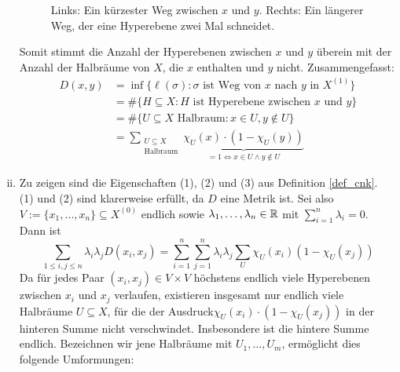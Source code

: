 \begin{beweis}
\begin{enumerate}[(i)]
\begin{figure}[h]
			\caption{Links: Ein kürzester Weg zwischen $x$ und $y$. Rechts: Ein längerer Weg, der eine Hyperebene zwei Mal schneidet.}
		\end{figure}
		
		Somit stimmt die Anzahl der Hyperebenen zwischen $x$ und $y$ überein mit der Anzahl der Halbräume von $X$, die $x$ enthalten und $y$ nicht. Zusammengefasst:
		\begin{equation}
		\begin{aligned}
		D(x,y) &= \inf \{ \ell(\sigma) : \sigma \text{ ist Weg von } x \text{ nach } y \text{ in } X^{(1)}\} \\
		&= \#\{H \subseteq X : H \text{ ist Hyperebene zwischen } x \text{ und } y\} \\
		&= \#\{U \subseteq X \text{ Halbraum} : x \in U, y \notin U \} \\
		&= \sum_{\substack{U \subseteq X \\ \text{Halbraum}}} \underbrace{\chi_U(x) \cdot (1- \chi_U(y))}_{= 1 \Leftrightarrow x \in U \wedge y \notin U}
		\end{aligned}
		\end{equation}
		\item Zu zeigen sind die Eigenschaften (1), (2) und (3) aus Definition \ref{def_cnk}. \\
		(1) und (2) sind klarerweise erfüllt, da $D$ eine Metrik ist. Sei also $V:= \{x_1, \dots, x_n\} \subseteq X^{(0)}$ endlich sowie $\lambda_1, \dots, \lambda_n \in \mathbb{R}$ mit $\sum_{i=1}^{n} \lambda_i = 0$. Dann ist
		\[ \sum\limits_{1 \leq i,j \leq n} \lambda_i \lambda_j D(x_i,x_j) = \sum\limits_{i=1}^{n} \sum\limits_{j=1}^{n} \lambda_i \lambda_j \sum\limits_{U} \chi_U (x_i) (1-\chi_U (x_j))\]
		\newpage
		Da für jedes Paar $(x_i,x_j) \in V \times V$ höchstens endlich viele Hyperebenen zwischen $x_i$ und $x_j$ verlaufen, existieren insgesamt nur endlich viele Halbräume $U \subseteq X$, für die der Ausdruck\linebreak $\chi_U(x_i) \cdot (1-\chi_U(x_j))$ in der hinteren Summe nicht verschwindet. Insbesondere ist die hintere Summe endlich. Bezeichnen wir jene Halbräume mit $U_1, \dots, U_m$, ermöglicht dies folgende Umformungen:
		

\end{enumerate}
\end{beweis}
